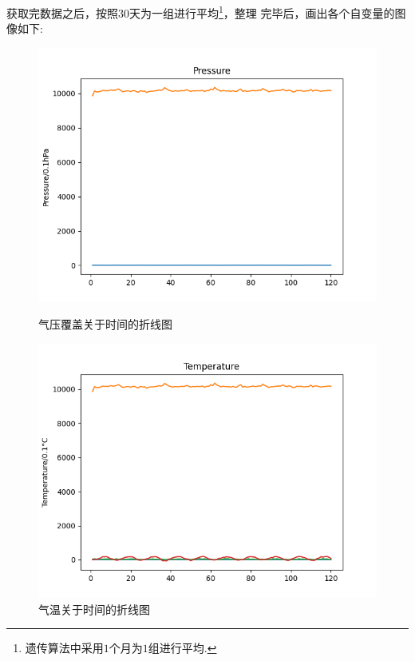 \documentclass[UTF8, a4paper]{ctexart}
\begin{document}
获取完数据之后，按照$30$天为一组进行平均\footnote{遗传算法中采用$1$个月为$1$组进行平均.}，整理
完毕后，画出各个自变量的图像如下:
\begin{figure}[h!]
	\centering
	\begin{minipage}[h!]{0.4\textwidth}
		\centering
		\includegraphics[scale=0.3]{../src/prepare_data/pp.png}
		\caption{气压覆盖关于时间的折线图}
	\end{minipage}
	\qquad
	\begin{minipage}[h!]{0.4\textwidth}
		\centering
		\includegraphics[scale=0.3]{../src/prepare_data/tg.png}
		\caption{气温关于时间的折线图}
	\end{minipage}
\end{figure}
\end{document}
